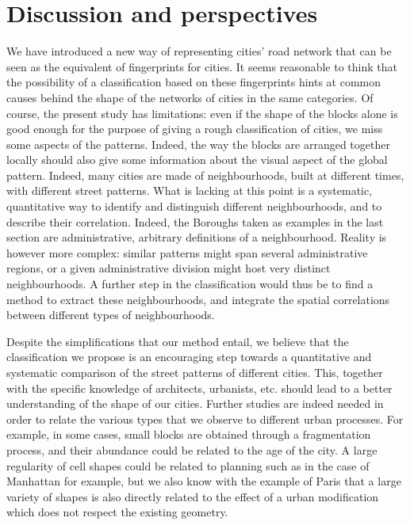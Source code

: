 \section{Discussion and perspectives}

We have introduced a new way of representing cities' road network that can be
seen as the equivalent of fingerprints for cities. It seems reasonable to think
that the possibility of a classification based on these fingerprints hints at
common causes behind the shape of the networks of cities in the same categories.
Of course, the present study has limitations: even if the shape of the blocks
alone is good enough for the purpose of giving a rough classification of cities,
we miss some aspects of the patterns. Indeed, the way the blocks are arranged
together locally should also give some information about the visual aspect of
the global pattern. Indeed, many cities are made of neighbourhoods, built at
different times, with different street patterns. What is lacking at this point
is a systematic, quantitative way to identify and distinguish different
neighbourhoods, and to describe their correlation. Indeed, the Boroughs taken as
examples in the last section are administrative, arbitrary definitions of a
neighbourhood. Reality is however more complex: similar patterns might span
several administrative regions, or a given administrative division might host
very distinct neighbourhoods. A further step in the classification would thus be
to find a method to extract these neighbourhoods, and integrate the spatial
correlations between different types of neighbourhoods.

Despite the simplifications that our method entail, we believe that the
classification we propose is an encouraging step towards a quantitative and
systematic comparison of the street patterns of different cities. This, together
with the specific knowledge of architects, urbanists, etc. should lead to a
better understanding of the shape of our cities. Further studies are indeed
needed in order to relate the various types that we observe to different urban
processes. For example, in some cases, small blocks are obtained through a
fragmentation process, and their abundance could be related to the age of the
city. A large regularity of cell shapes could be related to planning such as in
the case of Manhattan for example, but we also know with the example of Paris
\cite{Barthelemy:2013} that a large variety of shapes is also directly related
to the effect of a urban modification which does not respect the existing
geometry.\\


